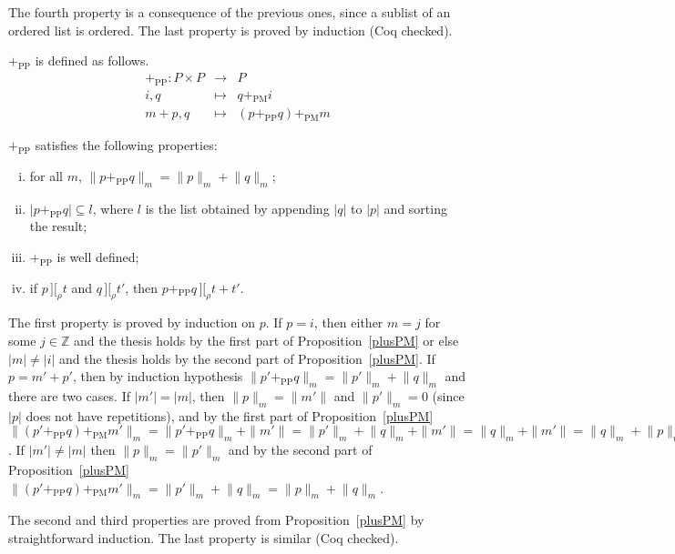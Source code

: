 \documentclass[numreferences]{kluwer}
\newcommand{\intII}{\,]\![}
\newcommand{\intrel}{\mathbin{\intII_{\rho}}}
\newcommand{\Z}{{\mathbb Z}}
\newcommand{\coeff}[2]{\ensuremath{\|#2\|_{#1}}}
\newcommand{\plusPM}{\ensuremath{+_{\mathrm{PM}}}}
\newcommand{\plusPP}{\ensuremath{+_{\mathrm{PP}}}}
\begin{document}
\begin{article}
\begin{pf}
The fourth property is a consequence of the previous ones, since a sublist
of an ordered list is ordered.  The last property is proved by induction
(Coq checked).
\end{pf}

\begin{definition}\label{defn:plusPP} {\plusPP} is defined as follows.
\begin{eqnarray*}
\plusPP : P\times P & \to & P \\
 i, q & \mapsto & q\plusPM i \\
 m+p, q & \mapsto & (p\plusPP q)\plusPM m
\end{eqnarray*}
\end{definition}

\begin{proposition}\label{plusPP}
{\plusPP} satisfies the following properties:
\begin{enumerate}[(i)]
\item for all $m$, $\coeff m{p\plusPP q}=\coeff mp+\coeff mq$;
\item $|p\plusPP q|\subseteq l$, where $l$ is the list obtained by appending
$|q|$ to $|p|$ and sorting the result;
\item {\plusPP} is well defined;
\item if $p\intrel t$ and $q\intrel t'$, then $p\plusPP q\intrel t+t'$.
\end{enumerate}
\end{proposition}
\begin{pf}
The first property is proved by induction on $p$.  If $p=i$, then
either $m=j$ for some $j\in\Z$ and the thesis holds by the first part
of Proposition~\ref{plusPM} or else $|m|\neq|i|$ and the thesis holds
by the second part of Proposition~\ref{plusPM}.  If $p=m'+p'$, then
by induction hypothesis $\coeff m{p'\plusPP q}=\coeff m{p'}+\coeff mq$
and there are two cases.  If $|m'|=|m|$, then $\coeff mp=\|m'\|$ and
$\coeff m{p'}=0$ (since $|p|$ does not have repetitions), and by the
first part of Proposition~\ref{plusPM}
$\coeff m{(p'\plusPP q)\plusPM m'}%
=\coeff m{p'\plusPP q}+\|m'\|%
=\coeff m{p'}+\coeff mq+\|m'\|%
=\coeff mq+\|m'\|%
=\coeff mq+\coeff mp$.
If $|m'|\neq|m|$ then $\coeff mp=\coeff m{p'}$ and by the second part
of Proposition~\ref{plusPM}
$\coeff m{(p'\plusPP q)\plusPM m'}%
=\coeff m{p'}+\coeff mq=%
\coeff mp+\coeff mq$.

The second and third properties are proved from
Proposition~\ref{plusPM} by straightforward induction.  The last
property is similar (Coq checked).
\end{pf}


\end{article}
\end{document}
